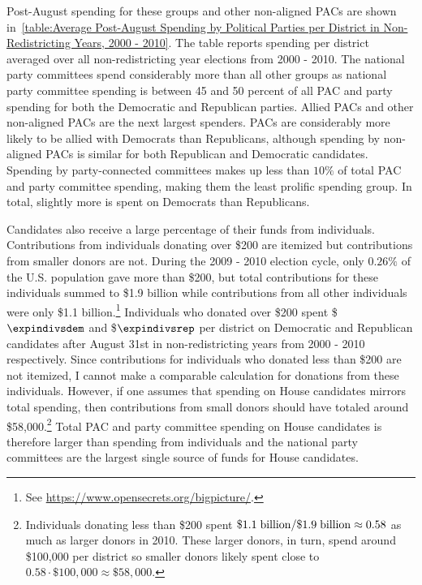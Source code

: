 \documentclass[12pt,final,fleqn]{article}
\theoremstyle{plain}
\begin{document}
Post-August spending for these groups and other non-aligned PACs are shown in~\autoref{table:Average Post-August Spending by Political Parties per District in Non-Redistricting Years, 2000 - 2010}. The table reports spending per district averaged over all non-redistricting year elections from 2000 - 2010. The national party committees spend considerably more than all other groups as national party committee spending is between 45 and 50 percent of all PAC and party spending for both the Democratic and Republican parties. Allied PACs and other non-aligned PACs are the next largest spenders. PACs are considerably more likely to be allied with Democrats than Republicans, although spending by non-aligned PACs is similar for both Republican and Democratic candidates. Spending by party-connected committees makes up less than $10\%$ of total PAC and party committee spending, making them the least prolific spending group. In total, slightly more is spent on Democrats than Republicans.

Candidates also receive a large percentage of their funds from individuals. Contributions from individuals donating over \$200 are itemized but contributions from smaller donors are not. During the 2009 - 2010 election cycle, only $0.26\%$ of the U.S. population gave more than \$200, but total contributions for these individuals summed to \$1.9 billion while contributions from all other individuals were only \$1.1 billion.\footnote{See \url{https://www.opensecrets.org/bigpicture/}.} Individuals who donated over \$200 spent \$$\expindivsdem$ and \$$\expindivsrep$ per district on Democratic and Republican candidates after August 31st in non-redistricting years from 2000 - 2010 respectively. Since contributions for individuals who donated less than \$200 are not itemized, I cannot make a comparable calculation for donations from these individuals. However, if one assumes that spending on House candidates mirrors total spending, then contributions from small donors should have totaled around \$58,000.\footnote{Individuals donating less than \$200 spent $\$1.1\; \rm{billion}/\$1.9\; \rm{billion} \approx 0.58$ as much as larger donors in 2010. These larger donors, in turn, spend around \$100,000 per district so smaller donors likely spent close to $0.58 \cdot \$100,000 \approx \$58,000$.} Total PAC and party committee spending on House candidates is therefore larger than spending from individuals and the national party committees are the largest single source of funds for House candidates.
\end{document}
